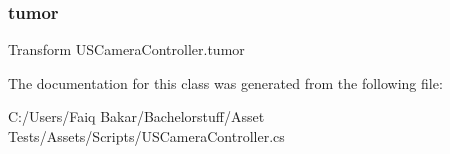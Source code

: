 \mbox{\label{class_u_s_camera_controller_aa88be26d544017db79b33460b4f4d237}} 
\subsubsection{\texorpdfstring{tumor}{tumor}}
{\footnotesize\ttfamily Transform U\+S\+Camera\+Controller.\+tumor}







The documentation for this class was generated from the following file\+:\begin{DoxyCompactItemize}
\item 
C\+:/\+Users/\+Faiq Bakar/\+Bachelorstuff/\+Asset Tests/\+Assets/\+Scripts/U\+S\+Camera\+Controller.\+cs\end{DoxyCompactItemize}
